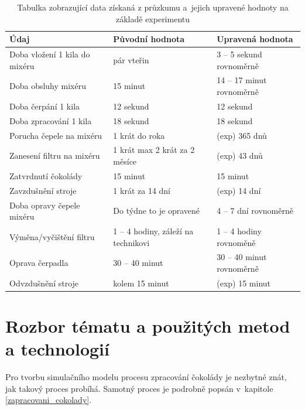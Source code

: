 \documentclass[11pt,a4paper,titlepage]{article}
\begin{document}
			\begin{table}[htb]
				\centering
			    \begin{tabular}{|l|l|l|}
				\hline
				    Údaj                            & Původní hodnota                      & Upravená hodnota            \\ \hline
					Doba vložení 1 kila do mixéru   & pár vteřin                           & 3 -- 5 sekund rovnoměrně    \\
				    Doba obsluhy mixéru             & 15 minut                             & 14 -- 17 minut rovnoměrně   \\
				    Doba čerpání 1 kila             & 12 sekund                            & 12 sekund                   \\
				    Doba zpracování 1 kila          & 18 sekund                            & 18 sekund                   \\ \hline
				    Porucha čepele na mixéru        & 1 krát do roka                       & (exp) 365 dnů               \\
				    Zanesení filtru na mixéru       & 1 krát max 2 krát za 2 měsíce        & (exp) 43 dnů                \\
				    Zatvrdnutí čokolády             & 15 minut 	                           & 15 minut                    \\
				    Zavzdušnění stroje              & 1 krát za 14 dní                     & (exp) 14 dní                \\ \hline
				    Doba opravy čepele mixéru       & Do týdne to je opravené              & 4 -- 7 dní rovnoměrně       \\
				    Výměna/vyčištění filtru         & 1 -- 4 hodiny, záleží na technikovi  & 1 -- 4 hodiny rovnoměně     \\
				    Oprava čerpadla                 & 30 -- 40 minut                       & 30 -- 40 minut rovnoměrně   \\
				    Odvzdušnění stroje              & kolem 15 minut                       & (exp) 15 minut              \\ \hline
			    \end{tabular}
				\caption{Tabulka zobrazující data získaná z průzkumu a~jejich upravené hodnoty na základě experimentu}
				\label{table:data}
			\end{table}

	\section{Rozbor tématu a použitých metod a technologií}
		Pro tvorbu simulačního modelu procesu zpracování čokolády je nezbytné
		znát, jak takový proces probíhá. Samotný proces je podrobně popsán v~kapitole
		\ref{zapracovani_cokolady}.
\end{document}
